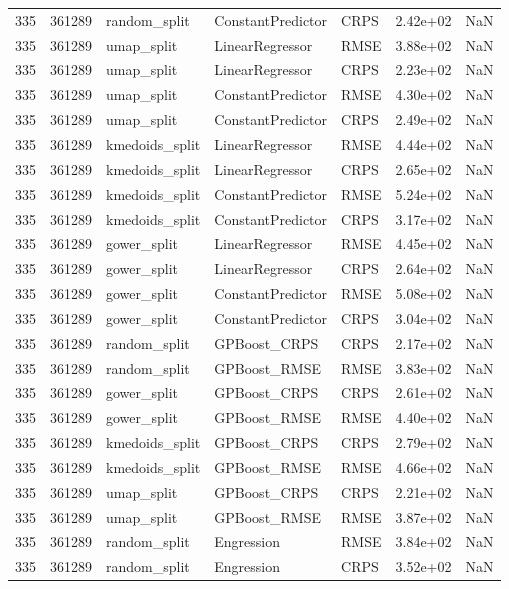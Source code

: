 \begin{tabular}{rrlllrr}
335 & 361289 & random\_split & ConstantPredictor & CRPS & 2.42e+02 & NaN \\
335 & 361289 & umap\_split & LinearRegressor & RMSE & 3.88e+02 & NaN \\
335 & 361289 & umap\_split & LinearRegressor & CRPS & 2.23e+02 & NaN \\
335 & 361289 & umap\_split & ConstantPredictor & RMSE & 4.30e+02 & NaN \\
335 & 361289 & umap\_split & ConstantPredictor & CRPS & 2.49e+02 & NaN \\
335 & 361289 & kmedoids\_split & LinearRegressor & RMSE & 4.44e+02 & NaN \\
335 & 361289 & kmedoids\_split & LinearRegressor & CRPS & 2.65e+02 & NaN \\
335 & 361289 & kmedoids\_split & ConstantPredictor & RMSE & 5.24e+02 & NaN \\
335 & 361289 & kmedoids\_split & ConstantPredictor & CRPS & 3.17e+02 & NaN \\
335 & 361289 & gower\_split & LinearRegressor & RMSE & 4.45e+02 & NaN \\
335 & 361289 & gower\_split & LinearRegressor & CRPS & 2.64e+02 & NaN \\
335 & 361289 & gower\_split & ConstantPredictor & RMSE & 5.08e+02 & NaN \\
335 & 361289 & gower\_split & ConstantPredictor & CRPS & 3.04e+02 & NaN \\
335 & 361289 & random\_split & GPBoost\_CRPS & CRPS & 2.17e+02 & NaN \\
335 & 361289 & random\_split & GPBoost\_RMSE & RMSE & 3.83e+02 & NaN \\
335 & 361289 & gower\_split & GPBoost\_CRPS & CRPS & 2.61e+02 & NaN \\
335 & 361289 & gower\_split & GPBoost\_RMSE & RMSE & 4.40e+02 & NaN \\
335 & 361289 & kmedoids\_split & GPBoost\_CRPS & CRPS & 2.79e+02 & NaN \\
335 & 361289 & kmedoids\_split & GPBoost\_RMSE & RMSE & 4.66e+02 & NaN \\
335 & 361289 & umap\_split & GPBoost\_CRPS & CRPS & 2.21e+02 & NaN \\
335 & 361289 & umap\_split & GPBoost\_RMSE & RMSE & 3.87e+02 & NaN \\
335 & 361289 & random\_split & Engression & RMSE & 3.84e+02 & NaN \\
335 & 361289 & random\_split & Engression & CRPS & 3.52e+02 & NaN \\

\end{tabular}
